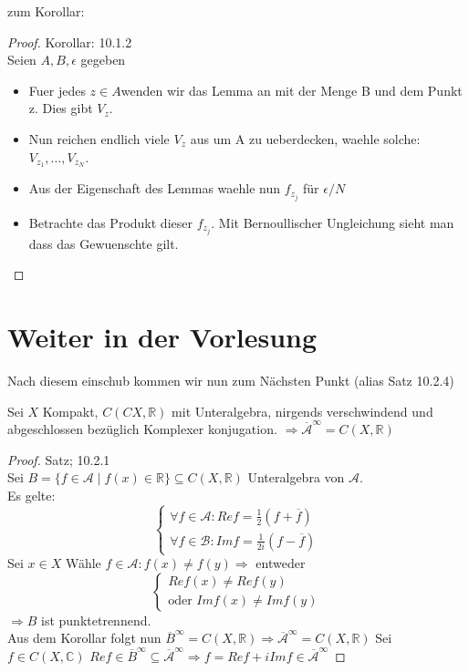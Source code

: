 zum Korollar:

\begin{proof}{Korollar: 10.1.2}\\
    Seien $A,B,\epsilon$ gegeben
\begin{itemize}
\item  Fuer jedes $z \in A $wenden wir das Lemma an mit der Menge B und dem Punkt z. Dies gibt $V_z$.
\item Nun reichen endlich viele $V_z$ aus um A zu ueberdecken, waehle solche: $V_{z_1},\dots,V_{z_N}.$
\item Aus der Eigenschaft des Lemmas waehle nun $f_{z_j}$ für $\epsilon/N$
\item Betrachte das Produkt dieser $f_{z_j}$. Mit Bernoullischer Ungleichung sieht man dass das Gewuenschte gilt.
\end{itemize}
\end{proof}

\section{Weiter in der Vorlesung}
Nach diesem einschub kommen wir nun zum Nächsten Punkt (alias Satz 10.2.4)

\thm{}
{
    Sei $X$ Kompakt, $C(CX,\mathbb{R})$ mit Unteralgebra, nirgends verschwindend und 
    abgeschlossen bezüglich Komplexer konjugation.
    $\Rightarrow \overline{\mathcal{A}}^{\infty}=C(X,\mathbb{R})$
}

\begin{proof}{Satz; 10.2.1}\\
    Sei $B=\{f\in \mathcal{A}\mid f(x)\in \mathbb{R}\}\subseteq C(X,\mathbb{R})$
    Unteralgebra von $\mathcal{A}$.\\

    Es gelte: 
  $$
    \begin{cases}
        \forall f \in \mathcal{A}:Re f = \frac{1}{2}(f+\overline{f})\\
        \forall f \in \mathcal{B}: Im f = \frac{1}{2i}(f-\overline{f})
    \end{cases}
 $$
    Sei $x \in X$ Wähle $f \in \mathcal{A}: f(x) \neq f(y) \Rightarrow$ entweder 
    $$
    \begin{cases}
    Re f(x) \neq Re f(y)\\
    \text{oder } Im f(x) \neq Im f(y)
    \end{cases}$$
     $\Rightarrow B$ ist punktetrennend.\\
    Aus dem Korollar folgt nun $\overline{B}^{\infty} = C(X,\mathbb{R}) \Rightarrow
    \overline{\mathcal{A}}^{\infty} = C(X,\mathbb{R})$
    Sei $f \in C(X,\mathbb{C})$ $Re f \in \overline{B}^{\infty} \subseteq \overline{\mathcal{A}}^{\infty} \Rightarrow
    f = Re f + i Im f \in \overline{\mathcal{A}}^{\infty}$
\end{proof}


